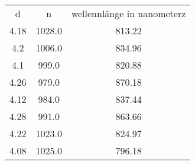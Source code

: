 \begin{table}
\begin{tabular}{ccc}
d & n & wellennlänge in nanometerz \\
4.18 & 1028.0 & 813.22 \\
4.2 & 1006.0 & 834.96 \\
4.1 & 999.0 & 820.88 \\
4.26 & 979.0 & 870.18 \\
4.12 & 984.0 & 837.44 \\
4.28 & 991.0 & 863.66 \\
4.22 & 1023.0 & 824.97 \\
4.08 & 1025.0 & 796.18 \\
\end{tabular}
\end{table}
